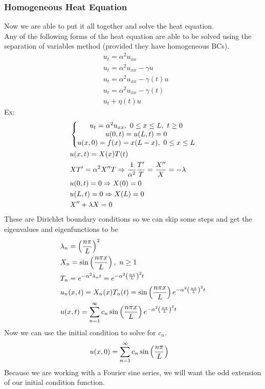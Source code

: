 \documentclass[11pt, fleqn]{article}
\begin{document}
\subsubsection{Homogeneous Heat Equation}
Now we are able to put it all together and solve the heat equation.\\
Any of the following forms of the heat equation are able to be solved using the separation of variables method (provided they have homogeneous BCs).
\begin{align*}
    &u_{t}=\alpha^2u_{xx}\\
    &u_{t}=\alpha^2u_{xx}-\gamma u\\
    &u_{t}=\alpha^2u_{xx}-\gamma(t)u\\
    &u_{t}=\alpha^2u_{xx}-\gamma(t)\\ &u_t+\eta(t)u
\end{align*}
Ex:
\begin{align*}
    &\left\{\begin{matrix} u_t=\alpha^2u_{xx},\ 0\leq x\leq L,\ t\geq 0\\ u(0,t)=u(L,t)=0\\ u(x,0)=f(x)=x(L-x),\ 0\leq x\leq L \end{matrix}\right.\\
    &u(x,t)=X(x)T(t)\\
    &XT'=\alpha^2 X''T\Rightarrow \frac{1}{\alpha^2}\frac{T'}{T}=\frac{X''}{X}=-\lambda\\
    &u(0,t)=0\Rightarrow X(0)=0\\
    &u(L,t)=0\Rightarrow X(L)=0\\
    &X''+\lambda X=0
\end{align*}
These are Dirichlet boundary conditions so we can skip some steps and get the eigenvalues and eigenfunctions to be
\begin{align*}
    &\lambda_n=\left( \frac{n\pi }{L} \right)^2\\
    &X_n=\sin\left( \frac{n\pi x}{L} \right),\ n\geq 1\\
    &T_n=e^{-\alpha^2\lambda_n t}=e^{-\alpha^2\left( \frac{n\pi}{L} \right)^2t}\\
    &u_n(x,t)=X_n(x)T_n(t)=\sin\left( \frac{n\pi x}{L} \right)e^{-\alpha^2\left( \frac{n\pi}{L} \right)^2t}\\
    &u(x,t)=\sum_{n=1}^\infty c_n\sin\left( \frac{n\pi x}{L} \right)e^{-\alpha^2\left( \frac{n\pi}{L} \right)^2t}
\end{align*}
Now we can use the  initial condition to solve for $c_n$.
\begin{align*}
    &u(x,0)=\sum_{n=1}^\infty c_n\sin\left( \frac{n\pi}{L} \right)
\end{align*}
Because we are working with a Fourier sine series, we will want the odd extension of our initial condition function.
\end{document}

